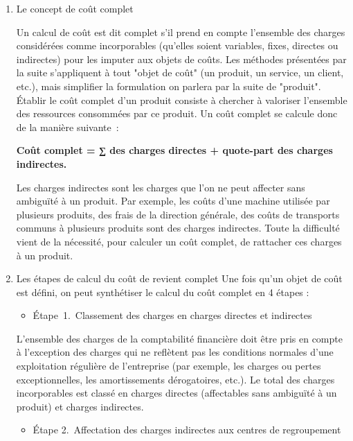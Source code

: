 \documentclass{tufte-handout}
\begin{document}
\begin{enumerate}
\item Le concept de coût complet
\label{sec:orgbb9f3f0}

Un calcul de coût est dit complet s'il prend en compte l'ensemble des charges considérées comme incorporables (qu'elles soient variables, fixes, directes ou indirectes) pour les imputer aux objets de coûts. Les méthodes présentées par la suite s'appliquent à tout "objet de coût" (un produit, un service, un client, etc.), mais simplifier la formulation on parlera par la suite de "produit".\\
Établir le coût complet d'un produit consiste à chercher à valoriser l'ensemble des ressources consommées par ce produit. Un coût complet se calcule donc de la manière suivante :\\
\begin{center}
\textbf{Coût complet = ∑ des charges directes + quote-part des charges indirectes.}\\
\end{center}
Les charges indirectes sont les charges que l'on ne peut affecter sans ambiguïté à un produit. Par exemple, les coûts d'une machine utilisée par plusieurs produits, des frais de la direction générale, des coûts de transports communs à plusieurs produits sont des charges indirectes. Toute la difficulté vient de la nécessité, pour calculer un coût complet, de rattacher ces charges à un produit.\\
\item Les étapes de calcul du coût de revient complet
\label{sec:orge7f5c7b}
Une fois qu'un objet de coût est défini, on peut synthétiser le calcul du coût complet en 4 étapes :\\
\begin{itemize}
\item Étape 1. Classement des charges en charges directes et indirectes\\
\end{itemize}
L'ensemble des charges de la comptabilité financière doit être pris en compte à l'exception des charges qui ne reflètent pas les conditions normales d'une exploitation régulière de l'entreprise (par exemple, les charges ou pertes exceptionnelles, les amortissements dérogatoires, etc.). Le total des charges incorporables est classé en charges directes (affectables sans ambiguïté à un produit) et charges indirectes.\\
\begin{itemize}
\item Étape 2. Affectation des charges indirectes aux centres de regroupement\\

\end{itemize}
\end{enumerate}
\end{document}
